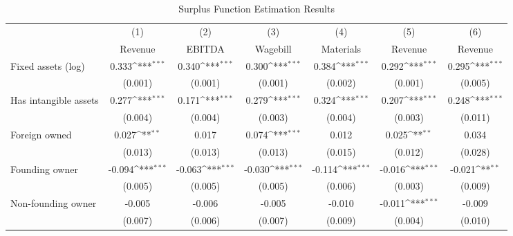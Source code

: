 \begin{table}[htbp]\centering
\def\sym#1{\ifmmode^{#1}\else\(^{#1}\)\fi}
\caption{Surplus Function Estimation Results}
\begin{tabular}{l*{6}{c}}
\toprule
                    &\multicolumn{1}{c}{(1)}&\multicolumn{1}{c}{(2)}&\multicolumn{1}{c}{(3)}&\multicolumn{1}{c}{(4)}&\multicolumn{1}{c}{(5)}&\multicolumn{1}{c}{(6)}\\
                    &\multicolumn{1}{c}{Revenue}&\multicolumn{1}{c}{EBITDA}&\multicolumn{1}{c}{Wagebill}&\multicolumn{1}{c}{Materials}&\multicolumn{1}{c}{Revenue}&\multicolumn{1}{c}{Revenue}\\
\midrule
Fixed assets (log)  &       0.333\sym{***}&       0.340\sym{***}&       0.300\sym{***}&       0.384\sym{***}&       0.292\sym{***}&       0.295\sym{***}\\
                    &     (0.001)         &     (0.001)         &     (0.001)         &     (0.002)         &     (0.001)         &     (0.005)         \\
\addlinespace
Has intangible assets&       0.277\sym{***}&       0.171\sym{***}&       0.279\sym{***}&       0.324\sym{***}&       0.207\sym{***}&       0.248\sym{***}\\
                    &     (0.004)         &     (0.004)         &     (0.003)         &     (0.004)         &     (0.003)         &     (0.011)         \\
\addlinespace
Foreign owned       &       0.027\sym{**} &       0.017         &       0.074\sym{***}&       0.012         &       0.025\sym{**} &       0.034         \\
                    &     (0.013)         &     (0.013)         &     (0.013)         &     (0.015)         &     (0.012)         &     (0.028)         \\
\addlinespace
Founding owner      &      -0.094\sym{***}&      -0.063\sym{***}&      -0.030\sym{***}&      -0.114\sym{***}&      -0.016\sym{***}&      -0.021\sym{**} \\
                    &     (0.005)         &     (0.005)         &     (0.005)         &     (0.006)         &     (0.003)         &     (0.009)         \\
\addlinespace
Non-founding owner  &      -0.005         &      -0.006         &      -0.005         &      -0.010         &      -0.011\sym{***}&      -0.009         \\
                    &     (0.007)         &     (0.006)         &     (0.007)         &     (0.009)         &     (0.004)         &     (0.010)         \\

\end{tabular}
\end{table}
